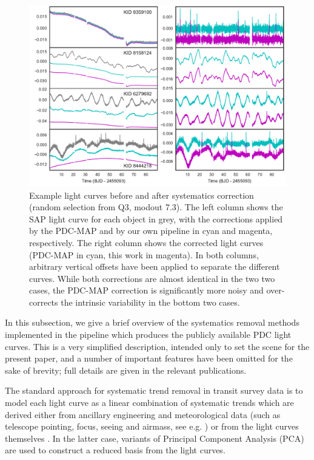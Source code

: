 \documentclass[useAMS,usenatbib]{mn2e}
\begin{document}
\begin{figure}
  \centering
  \includegraphics[width=\linewidth]{arc2_examples_q3.pdf} 
  \caption{Example light curves before and after systematics
    correction (random selection from Q3, modout 7.3). The left column shows the SAP light curve for each
    object in grey, with the corrections applied by the PDC-MAP and
    by our own pipeline in cyan and magenta, respectively. The right column
    shows the corrected light curves (PDC-MAP in cyan, this work in
    magenta). In both columns, arbitrary vertical offsets have been applied
    to separate the different curves. While both corrections are almost identical in the two two cases, the PDC-MAP correction is
    significantly more noisy and over-corrects the intrinsic
    variability in the bottom two cases.}
  \label{fig:ex_pdc}
\end{figure}

In this subsection, we give a brief overview of the systematics
removal methods implemented in the pipeline which produces the
publicly available PDC light curves. This is a very simplified
description, intended only to set the scene for the present paper, and
a number of important features have been omitted for the sake of
brevity; full details are given in the relevant publications.

The standard approach for systematic trend removal in transit survey
data is to model each light curve as a linear combination of
systematic trends which are derived either from ancillary engineering
and meteorological data (such as telescope pointing, focus, seeing and
airmass, see e.g. \citealt{bak+07}) or from the light curves
themselves \citep{tam+05,kov+05}. In the latter case, variants of
Principal Component Analysis (PCA) are used to construct a reduced
basis from the light curves.
\end{document}
